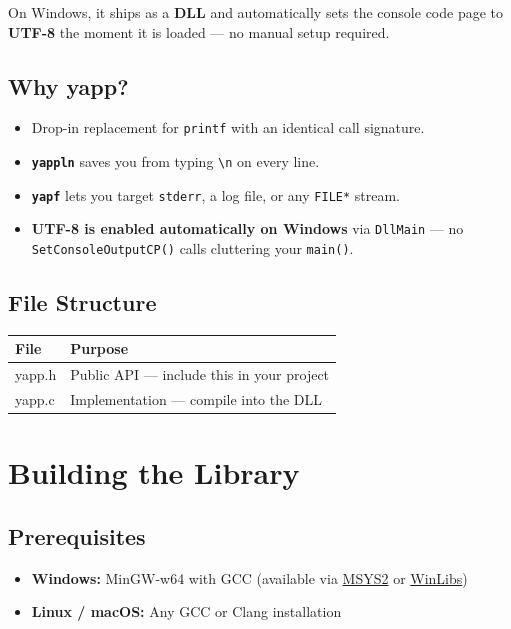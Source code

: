 \documentclass[11pt, a4paper]{article}
\newcommand{\fn}[1]{\texttt{\textbf{\textcolor{yapporange}{#1}}}}
\begin{document}
On Windows, it ships as a \textbf{DLL} and automatically sets the console code page to
\textbf{UTF-8} the moment it is loaded — no manual setup required.

\subsection{Why yapp?}

\begin{itemize}[noitemsep]
  \item Drop-in replacement for \texttt{printf} with an identical call signature.
  \item \fn{yappln} saves you from typing \texttt{\textbackslash n} on every line.
  \item \fn{yapf} lets you target \texttt{stderr}, a log file, or any \texttt{FILE*} stream.
  \item \textbf{UTF-8 is enabled automatically on Windows} via \texttt{DllMain} — no
        \texttt{SetConsoleOutputCP()} calls cluttering your \texttt{main()}.
\end{itemize}

\subsection{File Structure}

\begin{center}
\begin{tabular}{>{\ttfamily}l l}
\toprule
\normalfont\textbf{File} & \textbf{Purpose} \\
\midrule
yapp.h  & Public API — include this in your project \\
yapp.c  & Implementation — compile into the DLL \\
\bottomrule
\end{tabular}
\end{center}

\section{Building the Library}

\subsection{Prerequisites}

\begin{itemize}[noitemsep]
  \item \textbf{Windows:} MinGW-w64 with GCC (available via \href{https://www.msys2.org}{MSYS2} or
        \href{https://winlibs.com}{WinLibs})
  \item \textbf{Linux / macOS:} Any GCC or Clang installation
\end{itemize}
\end{document}
